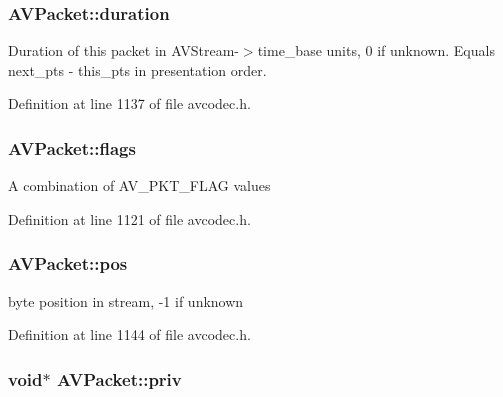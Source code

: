 \subsubsection[{\texorpdfstring{duration}{duration}}]{ A\+V\+Packet\+::duration}\hypertarget{struct_a_v_packet_af151ba1967c37038088883cd544eeacd}{}\label{struct_a_v_packet_af151ba1967c37038088883cd544eeacd}
Duration of this packet in A\+V\+Stream-\/$>$time\+\_\+base units, 0 if unknown. Equals next\+\_\+pts -\/ this\+\_\+pts in presentation order. 

Definition at line 1137 of file avcodec.\+h.

\subsubsection[{\texorpdfstring{flags}{flags}}]{ A\+V\+Packet\+::flags}\hypertarget{struct_a_v_packet_a437be96a9da675f12caa228a9c81bd82}{}\label{struct_a_v_packet_a437be96a9da675f12caa228a9c81bd82}
A combination of A\+V\+\_\+\+P\+K\+T\+\_\+\+F\+L\+AG values 

Definition at line 1121 of file avcodec.\+h.

\subsubsection[{\texorpdfstring{pos}{pos}}]{ A\+V\+Packet\+::pos}\hypertarget{struct_a_v_packet_ab5793d8195cf4789dfb3913b7a693903}{}\label{struct_a_v_packet_ab5793d8195cf4789dfb3913b7a693903}


byte position in stream, -\/1 if unknown 



Definition at line 1144 of file avcodec.\+h.

\subsubsection[{\texorpdfstring{priv}{priv}}]{ {\bf void}$\ast$ A\+V\+Packet\+::priv}\hypertarget{struct_a_v_packet_aeba7ec45ff7ac22381ad066f8eafdc96}{}\label{struct_a_v_packet_aeba7ec45ff7ac22381ad066f8eafdc96}


